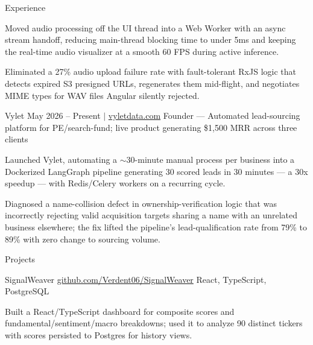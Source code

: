\documentclass[
	11pt
]{../../../template}
\begin{document}
\begin{rSection}{E}{xperience}
\begin{rSectionEntry}
			\item Moved audio processing off the UI thread into a Web Worker with an async stream handoff, reducing main-thread blocking time to under 5ms and keeping the real-time audio visualizer at a smooth 60 FPS during active inference.
			\item Eliminated a 27\% audio upload failure rate with fault-tolerant RxJS logic that detects expired S3 presigned URLs, regenerates them mid-flight, and negotiates MIME types for WAV files Angular silently rejected.
		\end{rSectionEntry}

		\begin{rSectionEntry}
			{Vylet}
			{May 2026 -- Present $\vert$ \href{https://vyletdata.com}{vyletdata.com}}
			{Founder --- Automated lead-sourcing platform for PE/search-fund; live product generating \$1,500 MRR across three clients}
			{}
			{}

			\item Launched Vylet, automating a $\sim$30-minute manual process per business into a Dockerized LangGraph pipeline generating 30 scored leads in 30 minutes --- a 30x speedup --- with Redis/Celery workers on a recurring cycle.
			\item Diagnosed a name-collision defect in ownership-verification logic that was incorrectly rejecting valid acquisition targets sharing a name with an unrelated business elsewhere; the fix lifted the pipeline's lead-qualification rate from 79\% to 89\% with zero change to sourcing volume.
		\end{rSectionEntry}
	\end{rSection}

	\begin{rSection}{P}{rojects}
		\begin{rSectionEntry}
			{SignalWeaver}
			{\href{https://github.com/Verdent06/SignalWeaver}{github.com/Verdent06/SignalWeaver}}
			{}
			{React, TypeScript, PostgreSQL}
			{}

			\item Built a React/TypeScript dashboard for composite scores and fundamental/sentiment/macro breakdowns; used it to analyze 90 distinct tickers with scores persisted to Postgres for history views.
		\end{rSectionEntry}
	\end{rSection}
\end{document}
